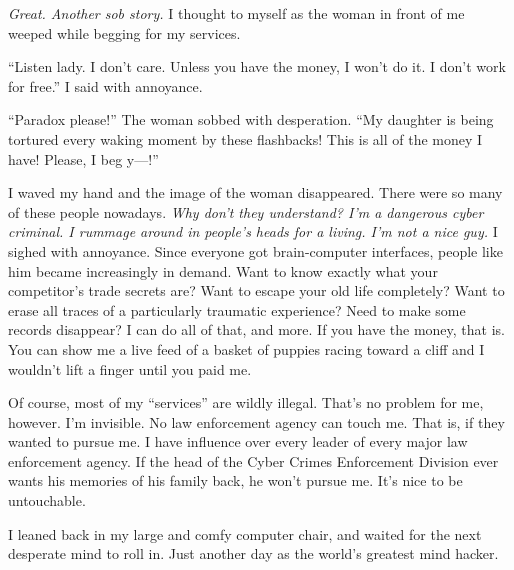 \documentclass[main.tex]{subfiles}
\begin{document}
\textit{Great.  Another sob story.}  I thought to myself as the woman in front of me weeped while
begging for my services.

\enquote{Listen lady.  I don't care.  Unless you have the money, I won't do it.  I don't work for free.}
I said with annoyance.  

\enquote{Paradox please!}  The woman sobbed with desperation.  \enquote{My daughter is being tortured every
waking moment by these flashbacks!  This is all of the money I have!  Please, I beg y---!}

I waved my hand and the image of the woman disappeared.  There were so many of these people nowadays. 
\textit{Why don't they understand?  I'm a dangerous cyber criminal.  I rummage around in people's
heads for a living.  I'm not a nice guy.  }  I sighed with annoyance.  Since everyone got brain-computer
interfaces, people like him became increasingly in demand.  Want to know exactly what your competitor's trade
secrets are?  Want to escape your old life completely?  Want to erase all traces of a particularly traumatic
experience?  Need to make some records disappear?  I can do all of that, and more.  If you have the money,
that is.  You can show me a live feed of a basket of puppies racing toward a cliff and I wouldn't lift a
finger until you paid me.  

Of course, most of my \enquote{services} are wildly illegal.  That's no problem for me, however.  I'm
invisible.  No law enforcement agency can touch me.  That is, if they wanted to pursue me.  I have influence
over every leader of every major law enforcement agency.  If the head of the Cyber Crimes Enforcement Division
ever wants his memories of his family back, he won't pursue me.  It's nice to be untouchable.  

I leaned back in my large and comfy computer chair, and waited for the next desperate mind to roll in.  Just
another day as the world's greatest mind hacker.  
\end{document}

